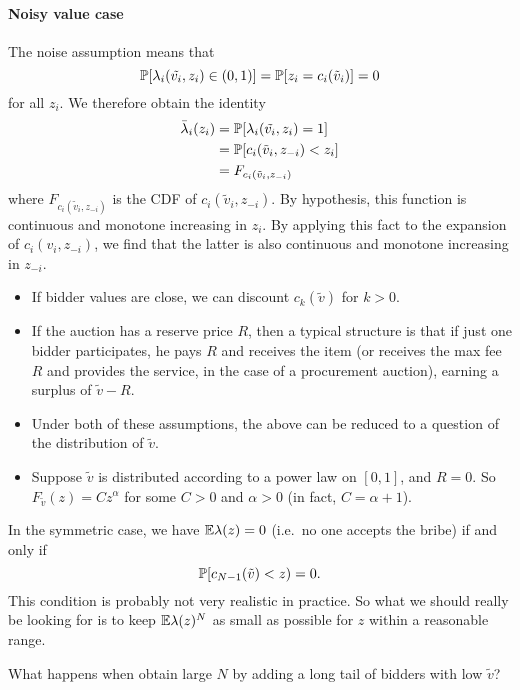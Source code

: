 \paragraph{Noisy value case}
The noise assumption means that 
\[
  \mathbb{P}[\lambda_i(\tilde{v_i},z_i)\in(0,1)]=\mathbb{P}[z_i=c_i(\tilde{v}_i)] = 0
\]
for all $z_i$. 
%
We therefore obtain the identity
\begin{align*}
  \bar\lambda_i(z_i) &= \mathbb{P}[\lambda_i(\tilde{v_i},z_i) = 1] \\
  &= \mathbb{P}[c_i(\tilde{v}_i,z_{-i}) < z_i ] \\
  &= F_{c_i(\tilde{v}_i,z_{-i})}
\end{align*}
where $F_{c_i(\tilde{v}_i,z_{-i})}$ is the CDF of $c_i(\tilde{v}_i,z_{-i})$.
%
By hypothesis, this function is continuous and monotone increasing in $z_i$.
%
By applying this fact to the expansion of $c_i(v_i,z_{-i})$, we find that the latter is also continuous and monotone increasing in $z_{-i}$.

\begin{itemize}
  \item If bidder values are close, we can discount $c_k(\tilde v)$ for $k>0$.
  \item If the auction has a reserve price $R$, then a typical structure is that if just one bidder participates, he pays $R$ and receives the item (or receives the max fee $R$ and provides the service, in the case of a procurement auction), earning a surplus of $\tilde v - R$.
  \item Under both of these assumptions, the above can be reduced to a question of the distribution of $\tilde v$.
  \item Suppose $\tilde v$ is distributed according to a power law on $[0,1]$, and $R=0$. So $F_{\tilde v}(z)= Cz^{\alpha}$ for some $C>0$ and $\alpha>0$ (in fact, $C=\alpha+1$).
\end{itemize}

In the symmetric case, we have $\mathbb{E}\lambda(z)=0$ (i.e.~no one accepts the bribe) if and only if
\[
  \mathbb{P}[c_{N-1}(\tilde v)<z) = 0.
\]
This condition is probably not very realistic in practice.
%
So what we should really be looking for is to keep $\mathbb{E}\lambda(z)^N$ as small as possible for $z$ within a reasonable range.

\begin{question}What happens when obtain large $N$ by adding a long tail of bidders with low $\tilde{v}$?\end{question}

